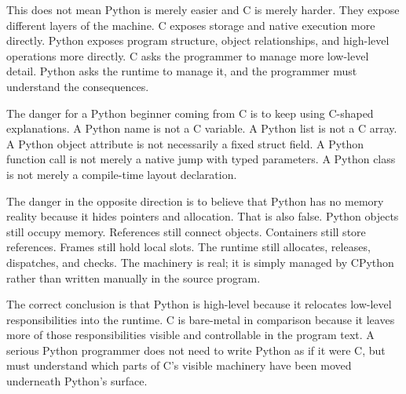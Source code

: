 This does not mean Python is merely easier and C is merely harder. They expose different layers of the machine. C exposes storage and native execution more directly. Python exposes program structure, object relationships, and high-level operations more directly. C asks the programmer to manage more low-level detail. Python asks the runtime to manage it, and the programmer must understand the consequences.

The danger for a Python beginner coming from C is to keep using C-shaped explanations. A Python name is not a C variable. A Python list is not a C array. A Python object attribute is not necessarily a fixed struct field. A Python function call is not merely a native jump with typed parameters. A Python class is not merely a compile-time layout declaration.

The danger in the opposite direction is to believe that Python has no memory reality because it hides pointers and allocation. That is also false. Python objects still occupy memory. References still connect objects. Containers still store references. Frames still hold local slots. The runtime still allocates, releases, dispatches, and checks. The machinery is real; it is simply managed by CPython rather than written manually in the source program.

The correct conclusion is that Python is high-level because it relocates low-level responsibilities into the runtime. C is bare-metal in comparison because it leaves more of those responsibilities visible and controllable in the program text. A serious Python programmer does not need to write Python as if it were C, but must understand which parts of C's visible machinery have been moved underneath Python's surface.